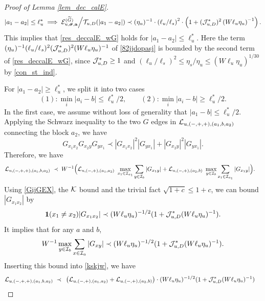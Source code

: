 \documentclass[10pt,reqno]{article}
\theoremstyle{plain} %
\theoremstyle{remark}
\numberwithin{equation}{section}
\begin{document}
\begin{proof}[Proof of Lemma \ref{lem_dec_calE}]
\begin{align}\label{82jjdopasj}
 |a_1-a_2|\le \ell_u^*\implies  \mathcal{E}_{u, \boldsymbol{\sigma}, \mathbf{a}}^{(\widetilde{G})} \Big/{\cal T}_{u,D}(|a_1-a_2|)\prec 
 (\eta_u)^{-1} \cdot \left(\ell_u / \ell_s\right)^2\cdot   \left(1+  (\mathcal{J}_{u, D}^*)^2 \left(W \ell_u \eta_u\right)^{-1 }\right).
 \end{align}
This implies that   \eqref{res_deccalE_wG} holds for $|a_1-a_2|\le \ell_u^*$. Here the term $(\eta_u)^{-1}(\ell_u/\ell_s)^2({\cal J}^*_{u,D})^2(W\ell_u\eta_u)^{-1}$ of \eqref{82jjdopasj} is bounded by the second term of \eqref{res_deccalE_wG}, since ${\cal J}^*_{u,D}\ge 1$ and $(\ell_u/\ell_s)^2\le \eta_s/\eta_u\le (W\ell_u\eta_u)^{1/30}$ by \eqref{con_st_ind}.



For   $|a_1-a_2|\ge \ell_u^*$,  we split it into  two cases  
 $$
 (1): \min_i|a_i-b|\le \ell_u^*/2,\quad \quad 
 (2): \min_i|a_i-b|\ge \ell_u^*/2.
 $$
In the first case,  we assume without loss of generality that $|a_1-b|\le \ell_u^*/2$. Applying  the Schwarz inequality to  the two $G$ edges  in ${\cal L}_{u, (-,+,+),(a_1, b , a_2)}$ connecting the block $a_2$,  we have 
$$
G_{x_1x_2}G_{x_2y}G_{yx_1}\prec |G_{x_1x_2}|^2|G_{yx_1}|+
|G_{ x_2 y}|^2|G_{yx_1}|.
$$
Therefore, we have 
\begin{align}\label{kskjw}
  {\cal L}_{u, (-,+,+),(a_1, b , a_2)}
  \;\prec\; &\;  W^{-1} \Big ( {\cal L}_{u, (-,+),(a_1, a_2)} \ \max_{x_1\in {\cal I}_{a_1}}\sum_{y\in {\cal I}_{b}}|G_{x_1y}|+ {\cal L}_{u, (-,+),(a_2, b)}\ \max_{y\in {\cal I}_{b}}\sum_{x_1\in {\cal I}_{a_1}}|G_{x_1y}| \Big )  .
\end{align}
Using \eqref{GijGEX},  the $\cal K$ bound and the trivial fact $\sqrt { 1+c } \le 1+c $,  we can bound $|G_{x_1x_2}|$ by 
$$
{\bf 1}(x_1\ne x_2)|G_{x_1x_2}|\prec (W\ell_u\eta_u)^{-1/2}(1+{\cal J}^*_{u,D}(W\ell_u\eta_u)^{-1}).
$$
It implies that for any $a $ and $b$, 
\begin{align}\label{jaysw2002}
  W^{-1}  \max_{y\in{\cal I}_b}\sum_{x\in{\cal I}_a}|G_{xy}|\prec (W\ell_u\eta_u)^{-1/2}(1+{\cal J}^*_{u,D}(W\ell_u\eta_u)^{-1}).
\end{align}
Inserting  this bound  into \eqref{kskjw}, we have 
\begin{align}
  {\cal L}_{u, (-,+,+),(a_1, b , a_2)}
     \;\prec\; &\;\left( {\cal L}_{u, (-,+),(a_1, a_2)}   + {\cal L}_{u, (-,+),(a_2, b)}  \right)  \cdot (W\ell_u\eta_u)^{-1/2}(1+{\cal J}^*_{u,D}(W\ell_u\eta_u)^{-1})
\end{align}

\end{proof}
\end{document}
